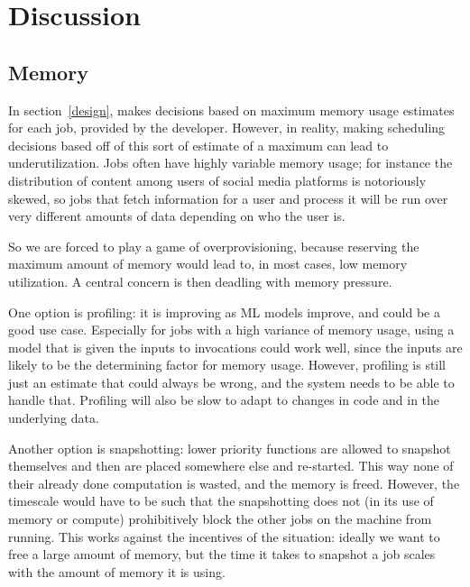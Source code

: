 \section{Discussion}

\subsection{Memory}

In section\ \ref{design}, \sys{} makes decisions based on maximum
memory usage estimates for each job, provided by the developer. However, in
reality, making scheduling decisions based off of this sort of estimate of a
maximum can lead to underutilization. Jobs often have highly variable memory
usage; for instance the distribution of content among users of social media
platforms is notoriously skewed\cite{TODO}, so jobs that fetch information for a
user and process it will be run over very different amounts of data depending on
who the user is.

So we are forced to play a game of overprovisioning, because reserving the
maximum amount of memory would lead to, in most cases, low memory
utilization. A central
concern is then deadling with memory pressure.

One option is profiling: it is improving as ML models improve, and could be a
good use case. Especially for jobs with a high variance of memory usage, using a
model that is given the inputs to invocations could work well, since the inputs
are likely to be the determining factor for memory usage. However, profiling is
still just an estimate that could always be wrong, and the system needs to be
able to handle that. Profiling will also be slow to adapt to changes in code and
in the underlying data.

Another option is snapshotting: lower priority functions are allowed to snapshot
themselves and then are placed somewhere else and re-started. This way none of
their already done computation is wasted, and the memory is freed. However, the
timescale would have to be such that the snapshotting does not (in its use of
memory or compute) prohibitively block the other jobs on the machine from
running. This works against the incentives of the situation: ideally we want to
free a large amount of memory, but the time it takes to snapshot a job scales
with the amount of memory it is using.
 
